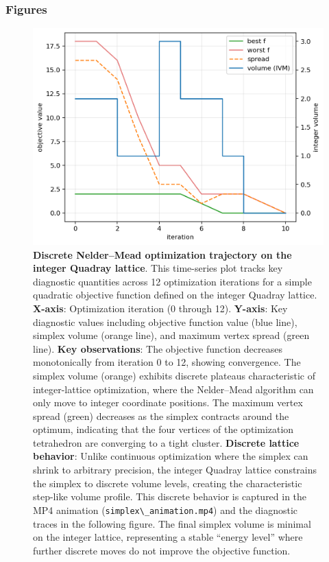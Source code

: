 \documentclass[
  10pt,
]{article}
\newcommand{\passthrough}[1]{#1}
\begin{document}
\hypertarget{figures-1}{%
\subsubsection{Figures}\label{figures-1}}

\begin{figure}
\centering
\includegraphics{../output/figures/simplex_trace.png}
\caption{\textbf{Discrete Nelder--Mead optimization trajectory on the
integer Quadray lattice}. This time-series plot tracks key diagnostic
quantities across 12 optimization iterations for a simple quadratic
objective function defined on the integer Quadray lattice.
\textbf{X-axis}: Optimization iteration (0 through 12). \textbf{Y-axis}:
Key diagnostic values including objective function value (blue line),
simplex volume (orange line), and maximum vertex spread (green line).
\textbf{Key observations}: The objective function decreases
monotonically from iteration 0 to 12, showing convergence. The simplex
volume (orange) exhibits discrete plateaus characteristic of
integer-lattice optimization, where the Nelder--Mead algorithm can only
move to integer coordinate positions. The maximum vertex spread (green)
decreases as the simplex contracts around the optimum, indicating that
the four vertices of the optimization tetrahedron are converging to a
tight cluster. \textbf{Discrete lattice behavior}: Unlike continuous
optimization where the simplex can shrink to arbitrary precision, the
integer Quadray lattice constrains the simplex to discrete volume
levels, creating the characteristic step-like volume profile. This
discrete behavior is captured in the MP4 animation
(\passthrough{\lstinline!simplex\_animation.mp4!}) and the diagnostic
traces in the following figure. The final simplex volume is minimal on
the integer lattice, representing a stable ``energy level'' where
further discrete moves do not improve the objective function.}
\end{figure}
\end{document}

